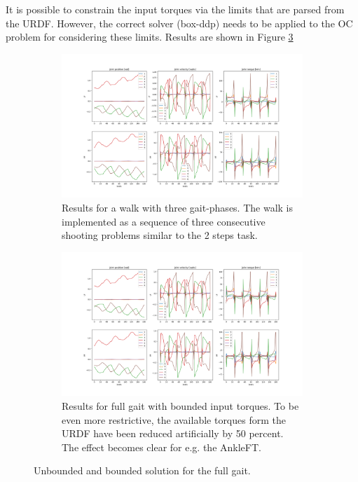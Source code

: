 It is possible to constrain the input torques via the limits that are parsed from the URDF. However, the correct solver (box-ddp) needs to be applied to the OC problem for considering these limits.  Results are shown in Figure \ref{fig:rh5_constrain_torque}
\begin{figure}[h!]
\centering
\begin{subfigure}{.8\textwidth}
  \centering
  \includegraphics[width=1\linewidth]{Media/Crocoddyl/RH5/RH5Gait_Solution.png}
  \caption{Results for a walk with three gait-phases. The walk is implemented as a sequence of three  consecutive shooting problems similar to the 2 steps task.}
\label{fig:rh5_full_gait}
\end{subfigure}
\begin{subfigure}{.8\textwidth}
  \centering
\includegraphics[width=1\linewidth]{Media/Crocoddyl/RH5/RH5GaitUbound_50PercentSolution.png}
\caption{Results for full gait with bounded input torques. To be even more restrictive, the available torques form the URDF have been reduced artificially by 50 percent. The effect becomes clear for e.g. the AnkleFT.}
\label{fig:rh5_constrain_torque}
\end{subfigure}
\caption{Unbounded and bounded solution for the full gait.}
\centering
\end{figure}

